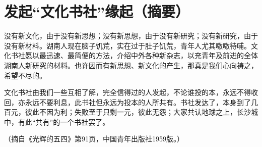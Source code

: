 \section{发起“文化书社”缘起（摘要）}



没有新文化，由于没有新思想；没有新思想，由于没有新研究；没有新研究，由于没有新材料。湖南人现在脑子饥荒，实在过于肚子饥荒，青年人尤其嗷嗷待哺。文化书社愿以最迅速、最简便的方法，介绍中外各种新杂志，以充青年及前进的全体湖南人新研究的材料。也许因而有新思想、新文化的产生，那真是我们心向祷之，希望不尽的。

文化书社由我们一些互相了解，完全信得过的人发起，不论谁投的本，永远不得收回，亦永远不要利息，此书社但永远为投本的人所共有。书社发达了，本身到了几百元，彼此不因为利；失败至于只剩一元，彼此无怨；大家共认地球之上，长沙城中，有此“共有”的一个书社罢了。

\begin{flushright}（摘自《光辉的五四》第91页，中国青年出版社1959版。）\end{flushright}

